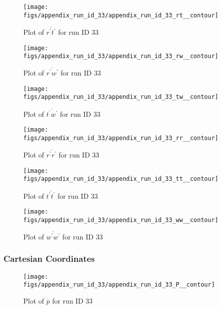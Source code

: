 \begin{figure}[H]
\centering
\texttt{[image: figs/appendix\_run\_id\_33/appendix\_run\_id\_33\_rt\_\_contour]}
\caption{Plot of $\overline{r^\prime t^\prime}$ for run ID 33}
\label{fig:appendix_run_id_33_rt__contour}
\end{figure}


\begin{figure}[H]
\centering
\texttt{[image: figs/appendix\_run\_id\_33/appendix\_run\_id\_33\_rw\_\_contour]}
\caption{Plot of $\overline{r^\prime w^\prime}$ for run ID 33}
\label{fig:appendix_run_id_33_rw__contour}
\end{figure}


\begin{figure}[H]
\centering
\texttt{[image: figs/appendix\_run\_id\_33/appendix\_run\_id\_33\_tw\_\_contour]}
\caption{Plot of $\overline{t^\prime w^\prime}$ for run ID 33}
\label{fig:appendix_run_id_33_tw__contour}
\end{figure}


\begin{figure}[H]
\centering
\texttt{[image: figs/appendix\_run\_id\_33/appendix\_run\_id\_33\_rr\_\_contour]}
\caption{Plot of $\overline{r^\prime r^\prime}$ for run ID 33}
\label{fig:appendix_run_id_33_rr__contour}
\end{figure}


\begin{figure}[H]
\centering
\texttt{[image: figs/appendix\_run\_id\_33/appendix\_run\_id\_33\_tt\_\_contour]}
\caption{Plot of $\overline{t^\prime t^\prime}$ for run ID 33}
\label{fig:appendix_run_id_33_tt__contour}
\end{figure}


\begin{figure}[H]
\centering
\texttt{[image: figs/appendix\_run\_id\_33/appendix\_run\_id\_33\_ww\_\_contour]}
\caption{Plot of $\overline{w^\prime w^\prime}$ for run ID 33}
\label{fig:appendix_run_id_33_ww__contour}
\end{figure}


\subsubsection{Cartesian Coordinates}
\begin{figure}[H]
\centering
\texttt{[image: figs/appendix\_run\_id\_33/appendix\_run\_id\_33\_P\_\_contour]}
\caption{Plot of $\overline{p}$ for run ID 33}
\label{fig:appendix_run_id_33_P__contour}
\end{figure}


